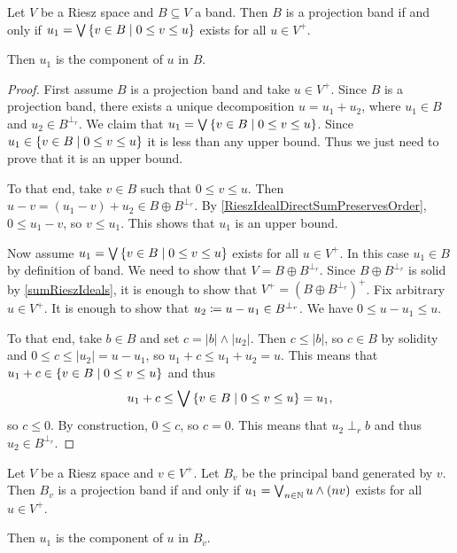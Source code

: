 \begin{proposition} \label{projectionBandCriterion}
Let $V$ be a Riesz space and $B\subseteq V$ a band. Then $B$ is a projection band \textup{if and only if} $u_1 = \bigvee \setbuilder{v\in B}{0\leq v\leq u}$ exists for all $u\in V^+$.

Then $u_1$ is the component of $u$ in $B$.
\end{proposition}
\begin{proof}
First assume $B$ is a projection band and take $u\in V^+$. Since $B$ is a projection band, there exists a unique decomposition $u = u_1 + u_2$, where $u_1 \in B$ and $u_2 \in B^{\perp_r}$. We claim that $u_1 = \bigvee \setbuilder{v\in B}{0\leq v\leq u}$. Since $u_1 \in \setbuilder{v\in B}{0\leq v\leq u}$ it is less than any upper bound. Thus we just need to prove that it is an upper bound.

To that end, take $v\in B$ such that $0\leq v\leq u$. Then $u-v = (u_1 - v) + u_2 \in B\oplus B^{\perp_r}$. By \ref{RieszIdealDirectSumPreservesOrder}, $0\leq u_1 - v$, so $v\leq u_1$. This shows that $u_1$ is an upper bound.

Now assume $u_1 = \bigvee \setbuilder{v\in B}{0\leq v\leq u}$ exists for all $u\in V^+$. In this case $u_1\in B$ by definition of band. We need to show that $V = B\oplus B^{\perp_r}$. Since $B\oplus B^{\perp_r}$ is solid by \ref{sumRieszIdeals}, it is enough to show that $V^+ = (B\oplus B^{\perp_r})^+$.  Fix arbitrary $u\in V^+$. It is enough to show that $u_2 \coloneqq u - u_1 \in B^{\perp_r}$. We have $0\leq u - u_1 \leq u$.

To that end, take $b\in B$ and set $c = |b|\wedge |u_2|$. Then $c\leq |b|$, so $c\in B$ by solidity and $0\leq c \leq |u_2| = u-u_1$, so $u_1 + c \leq u_1 + u_2 = u$. This means that $u_1 + c\in \setbuilder{v\in B}{0\leq v\leq u}$ and thus
\[ u_1 + c \leq \bigvee \setbuilder{v\in B}{0\leq v\leq u} = u_1, \]
so $c\leq 0$. By construction, $0\leq c$, so $c = 0$. This means that $u_2 \perp_r b$ and thus $u_2\in B^{\perp_r}$.
\end{proof}
\begin{corollary} \label{principalProjectionBandCriterion}
Let $V$ be a Riesz space and $v\in V^+$. Let $B_v$ be the principal band generated by $v$. Then $B_v$ is a projection band \textup{if and only if} $u_1 = \bigvee_{n\in \mathbb{N}} u\wedge (nv)$ exists for all $u\in V^+$.

Then $u_1$ is the component of $u$ in $B_v$.
\end{corollary}
